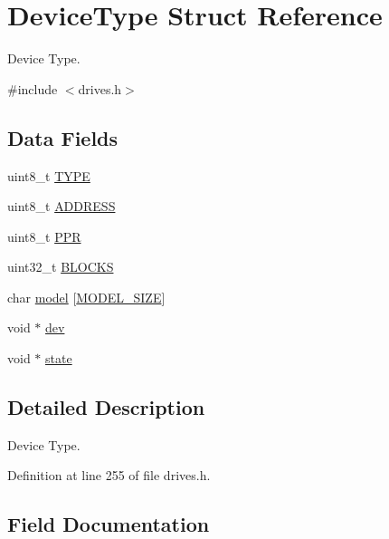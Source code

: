 \hypertarget{structDeviceType}{}\section{Device\+Type Struct Reference}
\label{structDeviceType}


Device Type.  




{\ttfamily \#include $<$drives.\+h$>$}

\subsection*{Data Fields}
\begin{DoxyCompactItemize}
\item 
uint8\+\_\+t \hyperlink{structDeviceType_acee5219162b6f47a9423b2086d127ede}{T\+Y\+PE}
\item 
uint8\+\_\+t \hyperlink{structDeviceType_a62529b7435785e39e8e7c5019303c2dd}{A\+D\+D\+R\+E\+SS}
\item 
uint8\+\_\+t \hyperlink{structDeviceType_ae0e59c6c17582ff80bdab3f2010e8d57}{P\+PR}
\item 
uint32\+\_\+t \hyperlink{structDeviceType_a29cbf84a3e9c8d01c8c77023ebf9c1f5}{B\+L\+O\+C\+KS}
\item 
char \hyperlink{structDeviceType_a47798e475b578d09f024fd983c69dfb6}{model} \mbox{[}\hyperlink{drives__sup_8h_a3f11d81c1e6d925611a9bdd5115064a0}{M\+O\+D\+E\+L\+\_\+\+S\+I\+ZE}\mbox{]}
\item 
void $\ast$ \hyperlink{structDeviceType_a59fc3b3cb45f8ee0cd1016bd64804d3b}{dev}
\item 
void $\ast$ \hyperlink{structDeviceType_ad0fc43d63606bab6c259047e36512e08}{state}
\end{DoxyCompactItemize}


\subsection{Detailed Description}
Device Type. 

Definition at line 255 of file drives.\+h.



\subsection{Field Documentation}
\mbox{\label{structDeviceType_a62529b7435785e39e8e7c5019303c2dd}} 
